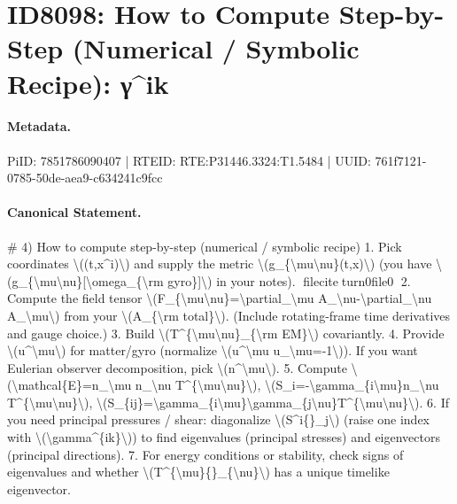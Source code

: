 \section*{ID8098: How to Compute Step-by-Step (Numerical / Symbolic Recipe): γ\textasciicircum{}ik}
\paragraph{Metadata.}
PiID: 7851786090407 | RTEID: RTE:P31446.3324:T1.5484 | UUID: 761f7121-0785-50de-aea9-c634241c9fcc

\paragraph{Canonical Statement.}
\# 4) How to compute step-by-step (numerical / symbolic recipe) 1. Pick coordinates \textbackslash{}((t,x\textasciicircum{}i)\textbackslash{}) and supply the metric \textbackslash{}(g\_\{\textbackslash{}mu\textbackslash{}nu\}(t,x)\textbackslash{}) (you have \textbackslash{}(g\_\{\textbackslash{}mu\textbackslash{}nu\}[\textbackslash{}omega\_\{\textbackslash{}rm gyro\}]\textbackslash{}) in your notes). fileciteturn0file0 2. Compute the field tensor \textbackslash{}(F\_\{\textbackslash{}mu\textbackslash{}nu\}=\textbackslash{}partial\_\textbackslash{}mu A\_\textbackslash{}nu-\textbackslash{}partial\_\textbackslash{}nu A\_\textbackslash{}mu\textbackslash{}) from your \textbackslash{}(A\_\{\textbackslash{}rm total\}\textbackslash{}). (Include rotating-frame time derivatives and gauge choice.) 3. Build \textbackslash{}(T\textasciicircum{}\{\textbackslash{}mu\textbackslash{}nu\}\_\{\textbackslash{}rm EM\}\textbackslash{}) covariantly. 4. Provide \textbackslash{}(u\textasciicircum{}\textbackslash{}mu\textbackslash{}) for matter/gyro (normalize \textbackslash{}(u\textasciicircum{}\textbackslash{}mu u\_\textbackslash{}mu=-1\textbackslash{})). If you want Eulerian observer decomposition, pick \textbackslash{}(n\textasciicircum{}\textbackslash{}mu\textbackslash{}). 5. Compute \textbackslash{}(\textbackslash{}mathcal\{E\}=n\_\textbackslash{}mu n\_\textbackslash{}nu T\textasciicircum{}\{\textbackslash{}mu\textbackslash{}nu\}\textbackslash{}), \textbackslash{}(S\_i=-\textbackslash{}gamma\_\{i\textbackslash{}mu\}n\_\textbackslash{}nu T\textasciicircum{}\{\textbackslash{}mu\textbackslash{}nu\}\textbackslash{}), \textbackslash{}(S\_\{ij\}=\textbackslash{}gamma\_\{i\textbackslash{}mu\}\textbackslash{}gamma\_\{j\textbackslash{}nu\}T\textasciicircum{}\{\textbackslash{}mu\textbackslash{}nu\}\textbackslash{}). 6. If you need principal pressures / shear: diagonalize \textbackslash{}(S\textasciicircum{}i\{\}\_j\textbackslash{}) (raise one index with \textbackslash{}(\textbackslash{}gamma\textasciicircum{}\{ik\}\textbackslash{})) to find eigenvalues (principal stresses) and eigenvectors (principal directions). 7. For energy conditions or stability, check signs of eigenvalues and whether \textbackslash{}(T\textasciicircum{}\{\textbackslash{}mu\}\{\}\_\{\textbackslash{}nu\}\textbackslash{}) has a unique timelike eigenvector.

